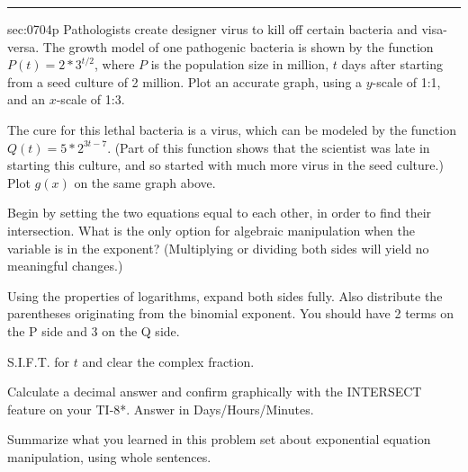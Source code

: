 \renewcommand{\columnseprule}{1.5pt}
\begin{multicols*}{2}
\rule[0.4\baselineskip]{0.4\textwidth}{1pt}
\noindent
{}\label{sec:0704p}
\begin{exercises}{sec:0704p}
\lab{} Pathologists create designer virus to kill off certain bacteria and visa-versa.  The growth model of one pathogenic bacteria is shown by the function $P(t) = 2*3^{t/2}$, where $P$ is the population size in million, $t$ days after starting from a seed culture of 2 million.  Plot an accurate graph, using a $y$-scale of 1:1, and an $x$-scale of 1:3.

\noindent
{}

\lab{} The cure for this lethal bacteria is a virus, which can be modeled by the function $Q(t) = 5*2^{3t-7}$.  (Part of this function shows that the scientist was late in starting this culture, and so started with much more virus in the seed culture.)  Plot $g(x)$ on the same graph above.

\vspace{2cm}
\lab{} Begin by setting the two equations equal to each other, in order to find their intersection.  What is the only option for algebraic manipulation when the variable is in the exponent?  (Multiplying or dividing both sides will yield no meaningful changes.)

\vspace{3cm}
\lab{} Using the properties of logarithms, expand both sides fully.  Also distribute the parentheses originating from the binomial exponent.  You should have 2 terms on the P side and 3 on the Q side.

\vspace{3cm}
\lab{} S.I.F.T. for $t$ and clear the complex fraction.

\vspace{5cm}
\lab{} Calculate a decimal answer and confirm graphically with the INTERSECT feature on your TI-8*.  Answer in Days/Hours/Minutes.

\vspace{3cm}
\lab{} Summarize what you learned in this problem set about exponential equation manipulation, using whole sentences.

\end{exercises}
\end{multicols*}